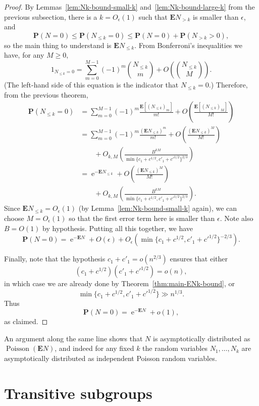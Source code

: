 \documentclass[ALCO,ThmDefs,Unicode,epreuves]{cedram}
\DeclareMathOperator{\Poisson}{Poisson}
\DeclareMathOperator{\expe}{e}
\newcommand{\eps}{\epsilon}
\renewcommand\P{\mathbf{P}}
\newcommand\E{\mathbf{E}}
\newcommand\br[1]{\left({#1}\right)}
\newcommand\pfrac[2]{\br{\frac{#1}{#2}}}
\begin{document}
\begin{proof}
By Lemmas~\ref{lem:Nk-bound-small-k} and~\ref{lem:Nk-bound-large-k} from the previous subsection, there is a $k = O_\eps(1)$ such that $\E N_{>k}$ is smaller than $\eps$, and
\[
 \P(N = 0) \leq \P(N_{\leq k} = 0) \leq \P(N = 0) + \P(N_{>k} > 0),
\]
so the main thing to understand is $\E N_{\leq k}$. From Bonferroni's inequalities we have, for any $M\geq 0$,
\[
 1_{N_{\leq k}=0} = \sum_{m=0}^{M-1} (-1)^m \binom{N_{\leq k}}{m} + O\left(\binom{N_{\leq k}}{M}\right).
\]
(The left-hand side of this equation is the indicator that $N_{\leq k} = 0$.)
Therefore, from the previous theorem,
\begin{align*}
 \P(N_{\leq k} = 0)
 &= \sum_{m=0}^{M-1} (-1)^m \frac{ \E [(N_{\leq k})_{m}]}{m!} + O \pfrac{\E[ (N_{\leq k})_M]}{M!} \\
 &= \sum_{m=0}^{M-1} (-1)^m \frac{ (\E N_{\leq k})^m}{m!}
 + O\pfrac{(\E N_{\leq k})^M}{M!} \\
 &\qquad + O_{k, M} \left( 
 \frac{B^{kM}}{\min\{c_1 + c^{1/2}, c'_1 + {c'}^{1/2}\}^{2/3}}\right) \\
 &= \expe^{-\E N_{\leq k}} 
 + O\pfrac{(\E N_{\leq k})^M}{M!} \\
 &\qquad + O_{k, M} \left( 
 \frac{B^{kM}}{\min\{c_1 + c^{1/2}, c'_1 + {c'}^{1/2}\}^{2/3}}\right).
\end{align*}
Since $\E N_{\leq k} = O_\eps(1)$ (by Lemma~\ref{lem:Nk-bound-small-k} again), we can choose $M = O_\eps(1)$ so that the first error term here is smaller than $\eps$. Note also $B = O(1)$ by hypothesis. Putting all this together, we have
\[
 \P(N = 0) = \expe^{-\E N} + O(\eps) + O_{\eps}\left(\min\{c_1 + c^{1/2}, c'_1 + {c'}^{1/2}\}^{-2/3} \right).
\]

Finally, note that the hypothesis $c_1 + c'_1 = o(n^{2/3})$ ensures that either
\[
 (c_1 + c^{1/2}) (c'_1 + {c'}^{1/2}) = o(n),
\]
in which case we are already done by Theorem~\ref{thm:main-ENk-bound}, or
\[
 \min\{c_1 + c^{1/2}, c'_1 + {c'}^{1/2}\} \gg n^{1/3}.
\]
Thus
\[
 \P(N = 0) = \expe^{-\E N} + o(1),
\]
as claimed.
\end{proof}

\begin{rema}
An argument along the same line shows that $N$ is asymptotically distributed as $\Poisson(\E N)$, and indeed for any fixed $k$ the random variables $N_1, \dots, N_k$ are asymptotically distributed as independent Poisson random variables.
\end{rema}

\section{Transitive subgroups} \label{sec:transitive-subgroups}
\end{document}
